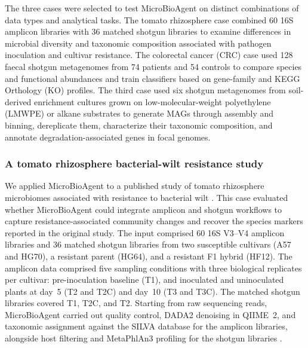 \documentclass[10pt,letterpaper]{article}
\begin{document}
The three cases were selected to test MicroBioAgent on distinct combinations
of data types and analytical tasks.  The tomato rhizosphere case combined 60
16S amplicon libraries with 36 matched shotgun libraries to examine differences
in microbial diversity and taxonomic composition associated with pathogen
inoculation and cultivar resistance.  The colorectal cancer (CRC) case used 128
faecal shotgun metagenomes from 74 patients and 54 controls to compare species
and functional abundances and train classifiers based on gene-family and KEGG
Orthology (KO) profiles.  The third case used six shotgun metagenomes from
soil-derived enrichment cultures grown on low-molecular-weight polyethylene
(LMWPE) or
alkane substrates to generate MAGs through assembly and binning, dereplicate
them, characterize their taxonomic composition, and annotate
degradation-associated genes in focal genomes.

\subsubsection{A tomato rhizosphere bacterial-wilt resistance study}
\label{sec:case-tomato}

We applied MicroBioAgent to a published study of tomato rhizosphere
microbiomes associated with resistance to bacterial wilt
\parencite{yin2022tomato}.  This case evaluated whether MicroBioAgent could
integrate amplicon and shotgun workflows to capture resistance-associated
community changes and recover the species markers reported in the original
study.  The input comprised 60 16S V3--V4 amplicon libraries and 36 matched
shotgun libraries from two susceptible cultivars (A57 and HG70), a resistant
parent (HG64), and a resistant F1 hybrid (HF12).  The amplicon data comprised
five sampling conditions with three biological replicates per cultivar:
pre-inoculation baseline (T1), and inoculated and uninoculated plants at day~5
(T2 and T2C) and day~10 (T3 and T3C).  The matched shotgun libraries covered
T1, T2C, and T2.  Starting from raw sequencing reads, MicroBioAgent carried out
quality control, DADA2 denoising in QIIME~2, and taxonomic assignment against the SILVA
database for the amplicon libraries, alongside host filtering and MetaPhlAn3
profiling for the shotgun libraries \parencite{callahan2016dada2,bolyen2019qiime2,quast2013silva,beghini2021biobakery}.
\end{document}
